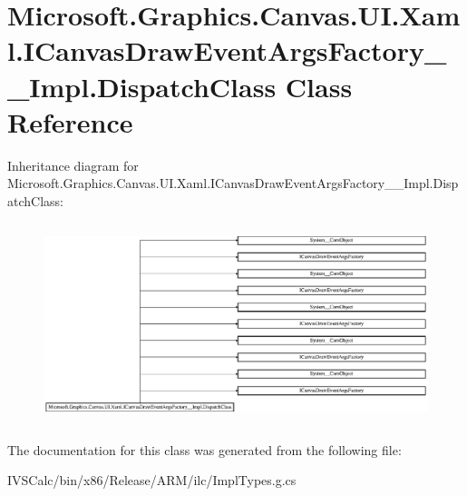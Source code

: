 \hypertarget{class_microsoft_1_1_graphics_1_1_canvas_1_1_u_i_1_1_xaml_1_1_i_canvas_draw_event_args_factory_____impl_1_1_dispatch_class}{}\section{Microsoft.\+Graphics.\+Canvas.\+U\+I.\+Xaml.\+I\+Canvas\+Draw\+Event\+Args\+Factory\+\_\+\+\_\+\+Impl.\+Dispatch\+Class Class Reference}
\label{class_microsoft_1_1_graphics_1_1_canvas_1_1_u_i_1_1_xaml_1_1_i_canvas_draw_event_args_factory_____impl_1_1_dispatch_class}
Inheritance diagram for Microsoft.\+Graphics.\+Canvas.\+U\+I.\+Xaml.\+I\+Canvas\+Draw\+Event\+Args\+Factory\+\_\+\+\_\+\+Impl.\+Dispatch\+Class\+:\begin{figure}[H]
\begin{center}
\leavevmode
\includegraphics[height=5.866667cm]{class_microsoft_1_1_graphics_1_1_canvas_1_1_u_i_1_1_xaml_1_1_i_canvas_draw_event_args_factory_____impl_1_1_dispatch_class}
\end{center}
\end{figure}


The documentation for this class was generated from the following file\+:\begin{DoxyCompactItemize}
\item 
I\+V\+S\+Calc/bin/x86/\+Release/\+A\+R\+M/ilc/Impl\+Types.\+g.\+cs\end{DoxyCompactItemize}
